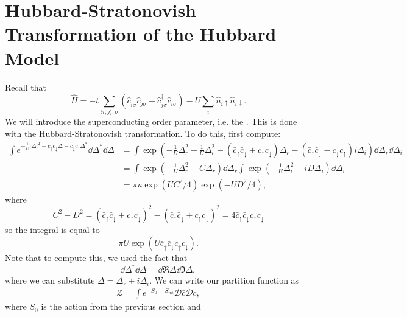 \documentclass{article}
\numberwithin{equation}{section}
\begin{document}
\section{Hubbard-Stratonovish Transformation of the Hubbard Model}
Recall that
\begin{equation}
    \hat{H} = -t\sum_{\langle i,j\rangle,\sigma} (\hat{c}^\dagger_{i\sigma}\hat{c}_{j\sigma} + \hat{c}^\dagger_{j\sigma}\hat{c}_{i\sigma}) - U\sum_i \hat{n}_{i\uparrow}\hat{n}_{i\downarrow}.
\end{equation}
We will introduce the superconducting order parameter, i.e. the . This is done with the Hubbard-Stratonovish transformation. To do this, first compute:
\begin{align}
    \int e^{-\frac{1}{U}|\Delta|^2 - \bar{c}_\uparrow \bar{c}_\downarrow\Delta - c_{\downarrow}c_{\uparrow}\Delta^*} \dd{\Delta^*}\dd{\Delta} &= \int \exp\left(-\frac{1}{U}\Delta_r^2 - \frac{1}{U}\Delta_i^2 - (\bar{c}_\uparrow\bar{c}_\downarrow + {c}_\uparrow {c}_\downarrow) \Delta_r  - (\bar{c}_\uparrow \bar{c}_\downarrow - c_\downarrow c_\uparrow)i\Delta_i\right) \dd{\Delta_r}\dd{\Delta_i} \\ 
    &= \int \exp\left(-\frac{1}{U}\Delta_r^2-C\Delta_r\right)\dd{\Delta_r}\int \exp\left(-\frac{1}{U}\Delta_i^2-iD\Delta_i\right)\dd{\Delta_i} \\ 
    &= \pi u \exp\left(UC^2/4\right)\exp\left(-UD^2/4\right),
\end{align}
where 
\begin{equation}
    C^2-D^2 = (\bar{c}_\uparrow\bar{c}_\downarrow+c_\uparrow c_\downarrow)^2 - (\bar{c}_\uparrow\bar{c}_\downarrow+c_\uparrow c_\downarrow)^2 = 4\bar{c}_\uparrow\bar{c}_\downarrow c_\uparrow c_\downarrow
\end{equation}
so the integral is equal to
\begin{equation}
    \pi U \exp\left(U\bar{c}_\uparrow\bar{c}_\downarrow c_\uparrow c_\downarrow\right).
\end{equation}
Note that to compute this, we used the fact that
\begin{equation}
    \dd{\Delta^*}\dd{\Delta} = \dd{\Re\Delta}\dd{\Im\Delta},
\end{equation}
where we can substitute $\Delta = \Delta_r + i\Delta_i.$ We can write our partition function as 
\begin{align}
    \mathcal{Z} = \int e^{-S_0-S_\text{int}} \mathcal{D}\bar{c}\mathcal{D}c,
\end{align}
where $S_0$ is the action from the previous section and 
\end{document}
